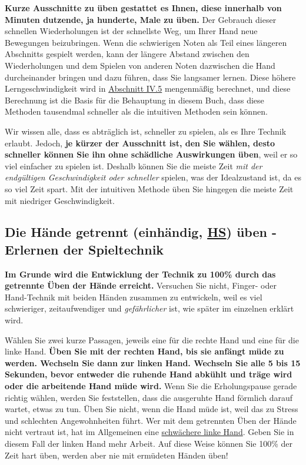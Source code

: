 \textbf{Kurze Ausschnitte zu üben gestattet es Ihnen, diese  innerhalb von Minuten dutzende, ja hunderte, Male zu üben.}
Der Gebrauch dieser schnellen Wiederholungen ist der schnellste Weg, um Ihrer Hand neue Bewegungen beizubringen.
Wenn die schwierigen Noten als Teil eines längeren Abschnitts gespielt werden, kann der längere Abstand zwischen den Wiederholungen und dem Spielen von anderen Noten dazwischen die Hand durcheinander bringen und dazu führen, dass Sie langsamer lernen.
Diese höhere Lerngeschwindigkeit wird in \hyperref[c1iv5]{Abschnitt IV.5} mengenmäßig berechnet, und diese Berechnung ist die Basis für die Behauptung in diesem Buch, dass diese Methoden tausendmal schneller als die intuitiven Methoden sein können.

Wir wissen alle, dass es abträglich ist, schneller zu spielen, als es Ihre Technik erlaubt.
Jedoch, \textbf{je kürzer der Ausschnitt ist, den Sie wählen, desto schneller können Sie ihn ohne schädliche Auswirkungen üben}, weil er so viel einfacher zu spielen ist.
Deshalb können Sie die meiste Zeit \textit{mit der endgültigen Geschwindigkeit oder schneller} spielen, was der Idealzustand ist, da es so viel Zeit spart.
Mit der intuitiven Methode üben Sie hingegen die meiste Zeit mit niedriger Geschwindigkeit.
 

\subsection{Die Hände getrennt (einhändig, \hyperref[HsHt]{HS}) üben - Erlernen der Spieltechnik}
\label{c1ii7}

\textbf{Im Grunde wird die Entwicklung der Technik zu 100\% durch das getrennte Üben der Hände erreicht.}
Versuchen Sie nicht, Finger- oder Hand-Technik mit beiden Händen zusammen zu entwickeln, weil es viel schwieriger, zeitaufwendiger und \textit{gefährlicher} ist, wie später im einzelnen erklärt wird.

Wählen Sie zwei kurze Passagen, jeweils eine für die rechte Hand und eine für die linke Hand.
\textbf{Üben Sie mit der rechten Hand, bis sie anfängt müde zu werden.
Wechseln Sie dann zur linken Hand.
Wechseln Sie alle 5 bis 15 Sekunden, bevor entweder die ruhende Hand abkühlt und träge wird oder die arbeitende Hand müde wird.}
Wenn Sie die Erholungspause gerade richtig wählen, werden Sie feststellen, dass die ausgeruhte Hand förmlich darauf wartet, etwas zu tun.
Üben Sie nicht, wenn die Hand müde ist, weil das zu Stress und schlechten Angewohnheiten führt.
Wer mit dem getrennten Üben der Hände nicht vertraut ist, hat im Allgemeinen eine \hyperref[c1ii20]{schwächere linke Hand}.
Geben Sie in diesem Fall der linken Hand mehr Arbeit.
Auf diese Weise können Sie 100\% der Zeit hart üben, werden aber nie mit ermüdeten Händen üben!


